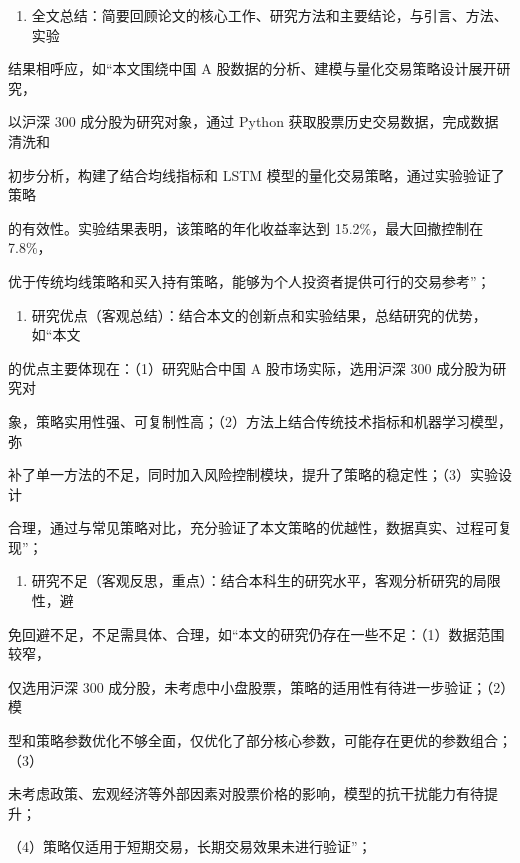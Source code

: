 \documentclass[
]{article}
\providecommand{\tightlist}{%
  \setlength{\itemsep}{0pt}\setlength{\parskip}{0pt}}
\begin{document}
\begin{enumerate}
\def\labelenumi{\arabic{enumi}.}
\tightlist
\item
  全文总结：简要回顾论文的核心工作、研究方法和主要结论，与引言、方法、实验
\end{enumerate}

结果相呼应，如``本文围绕中国 A
股数据的分析、建模与量化交易策略设计展开研究，

以沪深 300 成分股为研究对象，通过 Python
获取股票历史交易数据，完成数据清洗和

初步分析，构建了结合均线指标和 LSTM
模型的量化交易策略，通过实验验证了策略

的有效性。实验结果表明，该策略的年化收益率达到 15.2\%，最大回撤控制在
7.8\%，

优于传统均线策略和买入持有策略，能够为个人投资者提供可行的交易参考''；

\begin{enumerate}
\def\labelenumi{\arabic{enumi}.}
\setcounter{enumi}{1}
\tightlist
\item
  研究优点（客观总结）：结合本文的创新点和实验结果，总结研究的优势，如``本文
\end{enumerate}

的优点主要体现在：（1）研究贴合中国 A 股市场实际，选用沪深 300
成分股为研究对

象，策略实用性强、可复制性高；（2）方法上结合传统技术指标和机器学习模型，弥

补了单一方法的不足，同时加入风险控制模块，提升了策略的稳定性；（3）实验设计

合理，通过与常见策略对比，充分验证了本文策略的优越性，数据真实、过程可复现''；

\begin{enumerate}
\def\labelenumi{\arabic{enumi}.}
\setcounter{enumi}{2}
\tightlist
\item
  研究不足（客观反思，重点）：结合本科生的研究水平，客观分析研究的局限性，避
\end{enumerate}

免回避不足，不足需具体、合理，如``本文的研究仍存在一些不足：（1）数据范围较窄，

仅选用沪深 300
成分股，未考虑中小盘股票，策略的适用性有待进一步验证；（2）模

型和策略参数优化不够全面，仅优化了部分核心参数，可能存在更优的参数组合；（3）

未考虑政策、宏观经济等外部因素对股票价格的影响，模型的抗干扰能力有待提升；

（4）策略仅适用于短期交易，长期交易效果未进行验证''；
\end{document}
